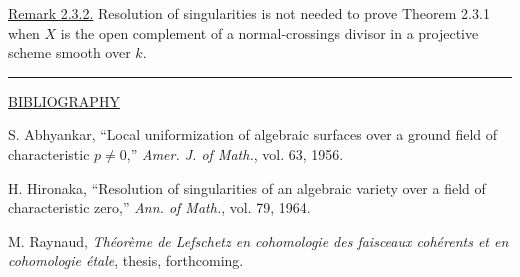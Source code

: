 
\underline{Remark 2.3.2.} Resolution of singularities is not needed to
prove Theorem 2.3.1 when $X$ is the open complement of a
normal-crossings divisor in a projective scheme smooth over $k$.

\begin{center}\rule{1.5cm}{0.4pt}\end{center}

\begin{center}\underline{BIBLIOGRAPHY}\end{center}

\begin{enumerate}[label={[\arabic*]},leftmargin=3em]
\item S. Abhyankar, ``Local uniformization of algebraic surfaces over a
ground field of characteristic $p\neq0$,'' \emph{Amer. J. of Math.},
vol. 63, 1956.

\item H. Hironaka, ``Resolution of singularities of an algebraic variety
over a field of characteristic zero,'' \emph{Ann. of Math.}, vol. 79,
1964.

\item M. Raynaud, \emph{Th\'eor\`eme de Lefschetz en cohomologie des
faisceaux coh\'erents et en cohomologie \'etale}, thesis, forthcoming.
\end{enumerate}
